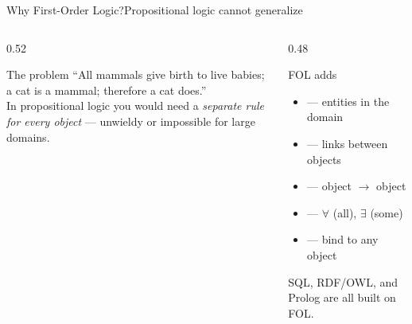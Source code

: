 \documentclass[aspectratio=169,11pt]{beamer}
\begin{document}
\begin{frame}{Why First-Order Logic?}{Propositional logic cannot generalize}
  \begin{columns}[T]
    \begin{column}{0.52\textwidth}
      \begin{alertblock}{The problem}
        \small ``All mammals give birth to live babies; a cat is a mammal;
        therefore a cat does.''
        \\[0.3em] In propositional logic you would need a \emph{separate rule for
        every object} — unwieldy or impossible for large domains.
      \end{alertblock}
    \end{column}
    \begin{column}{0.48\textwidth}
      \begin{block}{FOL adds}
        \small
        \begin{itemize}
          \item {} — entities in the domain
          \item {} — links between objects
          \item {} — object $\to$ object
          \item {} — $\forall$ (all), $\exists$ (some)
          \item {} — bind to any object
        \end{itemize}
      \end{block}
      \centering\scriptsize SQL, RDF/OWL, and Prolog are all built on FOL.
    \end{column}
  \end{columns}
\end{frame}
\end{document}
